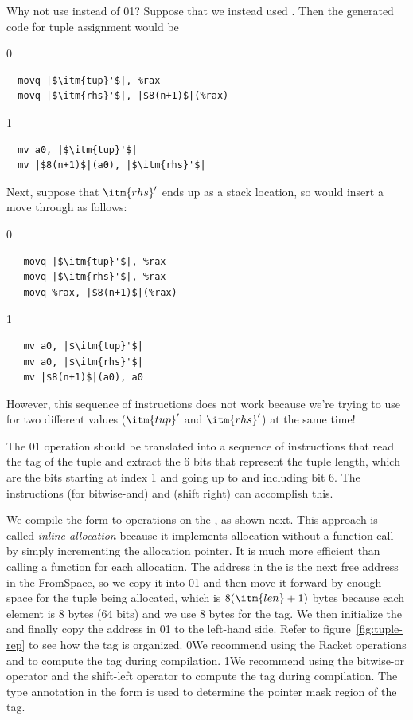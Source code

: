 \documentclass[7x10]{TimesAPriori_MIT}%
\def\racketEd{0}
\def\pythonEd{1}
\def\edition{1}
\def\xeightysixEd{0}
\def\riscvEd{1}
\def\architecture{1}
\newcommand\ifriscv[1]{\if\architecture\riscvEd{#1}\fi}
\newcommand\ifxeightsix[1]{\if\architecture\xeightysixEd{#1}\fi}
\newcommand{\racket}[1]{{\if\edition\racketEd{#1}\fi}}
\newcommand{\pythonColor}[0]{}
\newcommand{\python}[1]{{\if\edition\pythonEd\pythonColor #1\fi}}
\numberwithin{theorem}{chapter}
\numberwithin{definition}{chapter}
\numberwithin{equation}{chapter}
\begin{document}
Why not use \RAX{} instead of \ifxeightsix{}\ifriscv{}? Suppose that we instead used
\RAX. Then the generated code for tuple assignment would be
{\if\architecture\xeightysixEd
\begin{lstlisting}
  movq |$\itm{tup}'$|, %rax
  movq |$\itm{rhs}'$|, |$8(n+1)$|(%rax)
\end{lstlisting}
  \fi}
{\if\architecture\riscvEd
\begin{lstlisting}
  mv a0, |$\itm{tup}'$|
  mv |$8(n+1)$|(a0), |$\itm{rhs}'$|
\end{lstlisting}
  \fi}
Next, suppose that $\itm{rhs}'$ ends up as a stack location, so
 would insert a move through \RAX{}
as follows:
{\if\architecture\xeightysixEd
\begin{lstlisting}
   movq |$\itm{tup}'$|, %rax
   movq |$\itm{rhs}'$|, %rax
   movq %rax, |$8(n+1)$|(%rax)
\end{lstlisting}
  \fi}
{\if\architecture\riscvEd
\begin{lstlisting}
   mv a0, |$\itm{tup}'$|
   mv a0, |$\itm{rhs}'$|
   mv |$8(n+1)$|(a0), a0
\end{lstlisting}
  \fi}
However, this sequence of instructions does not work because we're
trying to use \RAX{} for two different values ($\itm{tup}'$ and
$\itm{rhs}'$) at the same time!

The \racket{}\python{} operation should
be translated into a sequence of instructions that read the tag of the
tuple and extract the 6 bits that represent the tuple length, which
are the bits starting at index 1 and going up to and including bit 6.
The \ArchName{} instructions \IAND{} (for bitwise-and) and \ISRL{}
(shift right) can accomplish this.

We compile the  form to operations on the
, as shown next.  This approach is called
\emph{inline allocation} because it implements allocation without a
function call by simply incrementing the allocation pointer. It is much
more efficient than calling a function for each allocation. The
address in the  is the next free address in the
FromSpace, so we copy it into \ifxeightsix{}\ifriscv{} and then move it forward by
enough space for the tuple being allocated, which is $8(\itm{len}+1)$
bytes because each element is 8 bytes (64 bits) and we use 8 bytes for
the tag.  We then initialize the  and finally copy the
address in \ifxeightsix{}\ifriscv{} to the left-hand side. Refer to
figure~\ref{fig:tuple-rep} to see how the tag is organized.
%
\racket{We recommend using the Racket operations
\code{bitwise-ior} and \code{arithmetic-shift} to compute the tag
during compilation.}
%
\python{We recommend using the bitwise-or operator \code{|} and the
  shift-left operator \code{<<} to compute the tag during
  compilation.}
%
The type annotation in the  form is used to determine
the pointer mask region of the tag.
\end{document}
